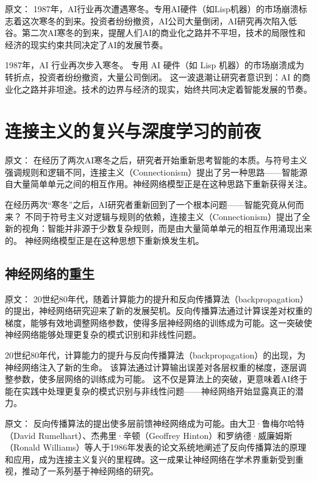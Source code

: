 原文：
1987年，AI行业再次遭遇寒冬。专用AI硬件（如Lisp机器）的市场崩溃标志着这次寒冬的到来。投资者纷纷撤资，AI公司大量倒闭，AI研究再次陷入低谷。第二次AI寒冬的到来，提醒人们AI的商业化之路并不平坦，技术的局限性和经济的现实约束共同决定了AI的发展节奏。

1987年，AI 行业再次步入寒冬。  
专用 AI 硬件（如 Lisp 机器）的市场崩溃成为转折点，投资者纷纷撤资，大量公司倒闭。  
这一波退潮让研究者意识到：AI 的商业化之路并非坦途。技术的边界与经济的现实，始终共同决定着智能发展的节奏。


\section{连接主义的复兴与深度学习的前夜}

原文：
在经历了两次AI寒冬之后，研究者开始重新思考智能的本质。与符号主义强调规则和逻辑不同，连接主义（Connectionism）提出了另一种思路——智能源自大量简单单元之间的相互作用。神经网络模型正是在这种思路下重新获得关注。

在经历两次“寒冬”之后，AI研究者重新回到了一个根本问题——智能究竟从何而来？  
不同于符号主义对逻辑与规则的依赖，连接主义（Connectionism）提出了全新的视角：智能并非源于少数复杂规则，而是由大量简单单元的相互作用涌现出来的。  
神经网络模型正是在这种思想下重新焕发生机。

\subsection{神经网络的重生}

原文：
20世纪80年代，随着计算能力的提升和反向传播算法（backpropagation）的提出，神经网络研究迎来了新的发展契机。反向传播算法通过计算误差对权重的梯度，能够有效地调整网络参数，使得多层神经网络的训练成为可能。这一突破使神经网络能够处理更复杂的模式识别和非线性问题。

20世纪80年代，计算能力的提升与反向传播算法（backpropagation）的出现，为神经网络注入了新的生命。  
该算法通过计算输出误差对各层权重的梯度，逐层调整参数，使多层网络的训练成为可能。  
这不仅是算法上的突破，更意味着AI终于能在实践中处理更复杂的模式识别与非线性问题——神经网络开始显露真正的潜力。

原文：
反向传播算法的提出使多层前馈神经网络成为可能。由大卫·鲁梅尔哈特（David Rumelhart）、杰弗里·辛顿（Geoffrey Hinton）和罗纳德·威廉姆斯（Ronald Williams）等人于1986年发表的论文系统地阐述了反向传播算法的原理和应用，成为连接主义复兴的里程碑。这一成果让神经网络在学术界重新受到重视，推动了一系列基于神经网络的研究。

